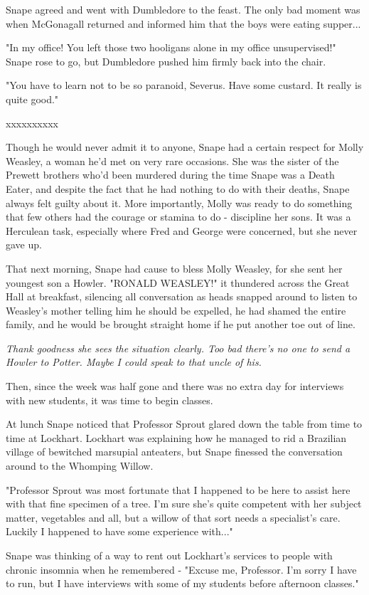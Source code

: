 \documentclass[a4paper,11pt]{article}
\begin{document}
Snape agreed and went with Dumbledore to the feast. The only bad moment was when McGonagall returned and informed him that the boys were eating supper...

"In my office! You left those two hooligans alone in my office unsupervised!" Snape rose to go, but Dumbledore pushed him firmly back into the chair.

"You have to learn not to be so paranoid, Severus. Have some custard. It really is quite good."

xxxxxxxxxx

Though he would never admit it to anyone, Snape had a certain respect for Molly Weasley, a woman he'd met on very rare occasions. She was the sister of the Prewett brothers who'd been murdered during the time Snape was a Death Eater, and despite the fact that he had nothing to do with their deaths, Snape always felt guilty about it. More importantly, Molly was ready to do something that few others had the courage or stamina to do - discipline her sons. It was a Herculean task, especially where Fred and George were concerned, but she never gave up.

That next morning, Snape had cause to bless Molly Weasley, for she sent her youngest son a Howler. "RONALD WEASLEY!" it thundered across the Great Hall at breakfast, silencing all conversation as heads snapped around to listen to Weasley's mother telling him he should be expelled, he had shamed the entire family, and he would be brought straight home if he put another toe out of line.

\emph{Thank goodness she sees the situation clearly. Too bad there's no one to send a Howler to Potter. Maybe I could speak to that uncle of his.}

Then, since the week was half gone and there was no extra day for interviews with new students, it was time to begin classes.

At lunch Snape noticed that Professor Sprout glared down the table from time to time at Lockhart. Lockhart was explaining how he managed to rid a Brazilian village of bewitched marsupial anteaters, but Snape finessed the conversation around to the Whomping Willow.

"Professor Sprout was most fortunate that I happened to be here to assist here with that fine specimen of a tree. I'm sure she's quite competent with her subject matter, vegetables and all, but a willow of that sort needs a specialist's care. Luckily I happened to have some experience with..."

Snape was thinking of a way to rent out Lockhart's services to people with chronic insomnia when he remembered - "Excuse me, Professor. I'm sorry I have to run, but I have interviews with some of my students before afternoon classes."
\end{document}
